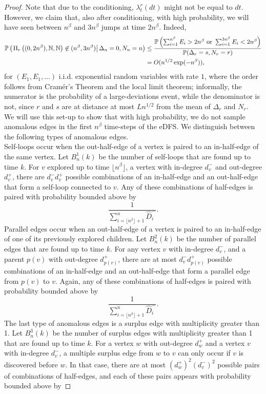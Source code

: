 \begin{proof}
Note that due to the conditioning, $\lambda^r_t(dt)$ might not be equal to $dt$. However, we claim that, also after conditioning, with high probability, we will have seen between $n^\beta$ and $3n^\beta$ jumps at time $2n^{\beta}$. Indeed,
\begin{align}\begin{split}\label{eq.numberofjumpsinrandommeasure}{\mathbb P}\left(\left.\Pi_r\left((0,2n^{\beta}),{\mathbb N},{\mathbb N}\right)\not\in (n^\beta,3n^\beta)\right|\Delta_n=0, N_n=n\right)&\leq \frac{{\mathbb P}\left(\sum_{i=1}^{n^\beta}E_i>2n^{\beta}\text{ or }\sum_{i=1}^{3n^\beta}E_i<2n^{\beta}\right)}{{\mathbb P}(\Delta_r=s, N_r=r)}\\
&=O(n^{1/2}\exp(-n^\beta)),\end{split}\end{align}
for $(E_1,E_1,\dots)$ i.i.d. exponential random variables with rate $1$, where the order follows from Cramér's Theorem and the local limit theorem; informally, the numerator is the probability of a large-deviations event, while the denominator is not, since $r$ and $s$ are at distance at most $Ln^{1/2}$ from the mean of $\Delta_r$ and $N_r$. \\
We will use this set-up to show that with high probability, we do not sample anomalous edges in the first $n^\beta$ time-steps of the eDFS. We distinguish between the following types of anomalous edges.\\
Self-loops occur when the out-half-edge of a vertex is paired to an in-half-edge of the same vertex.  Let $B^1_n(k)$ be the number of self-loops that are found up to time $k$. For $v$ explored up to time $\lfloor n^\beta\rfloor$, a vertex with in-degree $d^-_v$ and out-degree $d^+_v$, there are $d^-_v d^+_v$ possible combinations of an in-half-edge and an out-half-edge that form a self-loop connected to $v$. Any of these combinations of half-edges is paired with probability bounded above by 
$$\frac{1}{\sum_{i=\lfloor n^\beta \rfloor+1}^n\hat{D}^-_i}.$$
Parallel edges occur when an out-half-edge of a vertex is paired to an in-half-edge of one of its previously explored children. Let $B^2_n(k)$ be the number of parallel edges that are found up to time $k$. For any vertex $v$ with in-degree $d^-_v$, and a parent $p(v)$ with out-degree $d^+_{p(v)}$, there are at most $d^-_v d^+_{p(v)}$ possible combinations of an in-half-edge and an out-half-edge that form a parallel edge from $p(v)$ to $v$. Again, any of these combinations of half-edges is paired with probability bounded above by 
$$\frac{1}{\sum_{i=\lfloor n^\beta \rfloor+1}^n \hat{D}^-_i}.$$
The last type of anomalous edges is a surplus edge with multiplicity greater than 1. Let $B^3_n(k)$ be the number of surplus edges with multiplicity greater than 1 that are found up to time $k$. For a vertex $w$ with out-degree $d^+_w$ and a vertex $v$ with in-degree $d^-_v$, a multiple surplus edge from $w$ to $v$ can only occur if $v$ is discovered before $w$. In that case, there are at most $(d^+_w)^2(d^-_v)^2$ possible pairs of combinations of half-edges, and each of these pairs appears with probability bounded above by

\end{proof}
